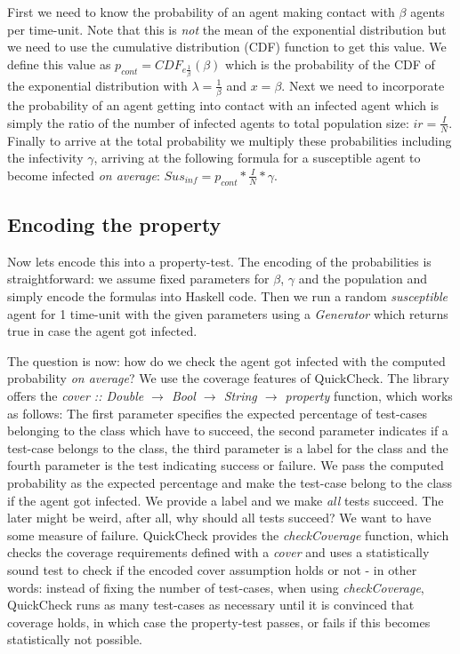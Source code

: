 First we need to know the probability of an agent making contact with $\beta$ agents per time-unit. Note that this is \textit{not} the mean of the exponential distribution but we need to use the cumulative distribution (CDF) function to get this value. We define this value as $p_{cont} = CDF_{e{\frac{1}{\beta}}} (\beta)$ which is the probability of the CDF of the exponential distribution with $\lambda = \frac{1}{\beta}$ and $x = \beta$.
Next we need to incorporate the probability of an agent getting into contact with an infected agent which is simply the ratio of the number of infected agents to total population size: $ir = \frac{I}{N}$. Finally to arrive at the total probability we multiply these probabilities including the infectivity $\gamma$, arriving at the following formula for a susceptible agent to become infected \textit{on average}: $Sus_{inf} = p_{cont} * \frac{I}{N} * \gamma$.

\subsection{Encoding the property}
Now lets encode this into a property-test. The encoding of the probabilities is straightforward: we assume fixed parameters for $\beta$, $\gamma$ and the population and simply encode the formulas into Haskell code. Then we run a random \textit{susceptible} agent for 1 time-unit with the given parameters using a \textit{Generator} which returns true in case the agent got infected. 

The question is now: how do we check the agent got infected with the computed probability \textit{on average}? We use the coverage features of QuickCheck. The library offers the \textit{cover :: Double $\rightarrow$ Bool $\rightarrow$ String $\rightarrow$ property} function, which works as follows: The first parameter specifies the expected percentage of test-cases belonging to the class which have to succeed, the second parameter indicates if a test-case belongs to the class, the third parameter is a label for the class and the fourth parameter is the test indicating success or failure. We pass the computed probability as the expected percentage and make the test-case belong to the class if the agent got infected. We provide a label and we make \textit{all} tests succeed. The later might be weird, after all, why should all tests succeed? We want to have some measure of failure. QuickCheck provides the \textit{checkCoverage} function, which checks the coverage requirements defined with a \textit{cover} and uses a statistically sound test to check if the encoded cover assumption holds or not - in other words: instead of fixing the number of test-cases, when using \textit{checkCoverage}, QuickCheck runs as many test-cases as necessary until it is convinced that coverage holds, in which case the property-test passes, or fails if this becomes statistically not possible.

